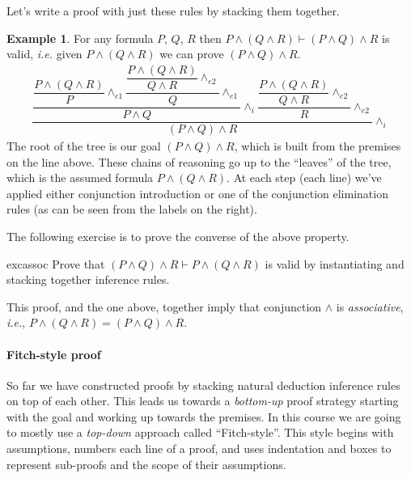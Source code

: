 \documentclass{article}
\theoremstyle{definition}
\newtheorem{example}{Example}
\newcommand{\ie}{\emph{i.e.}}
\begin{document}
Let's write a proof with just these rules by stacking them together.

\begin{example}
\label{exm:assoc-conj}
  For any formula $P$, $Q$, $R$ then $P \wedge (Q \wedge
  R) \vdash (P \wedge Q) \wedge R$ is valid, \ie{} given $P \wedge (Q \wedge
  R)$ we can prove $(P \wedge Q) \wedge R$.
%
\newcommand{\conge}[1]{\wedge_{e#1}}
  \begin{align*}
    \dfrac{
    \dfrac{\dfrac{P \wedge (Q \wedge R)}
    {P}\conge{1}
    \dfrac{\dfrac{P \wedge (Q \wedge R)}
    {Q \wedge R} \conge{2}}{Q} \conge{1}}
    {P \wedge Q} {\wedge_i}
    \dfrac{\dfrac{P \wedge (Q \wedge R)}
    {Q \wedge R} \conge{2}}{R} \conge{2}}
    {(P \wedge Q) \wedge R} {\wedge_i}
  \end{align*}
The root of the tree is our goal $(P \wedge Q) \wedge R$, which is
built from the premises on the line above. These chains of reasoning
go up to the ``leaves'' of the tree, which is the assumed formula
$P \wedge (Q \wedge R)$. At each step (each line) we've applied
either conjunction introduction or one of the conjunction elimination
rules (as can be seen from the labels on the right).
\end{example}
\noindent
The following exercise is to prove the converse of the above property.
%
\begin{restatable}{exc}{assoc}
  \label{exm:assoc}
  Prove that $(P \wedge Q) \wedge R \vdash P \wedge (Q \wedge R)$ is
  valid by instantiating and stacking together inference rules.
\end{restatable}
%
This proof, and the one above, together imply that conjunction
$\wedge$ is \emph{associative}, \ie{},
$P \wedge (Q \wedge R) = (P \wedge Q) \wedge R$.

\paragraph{Fitch-style proof}
So far we have constructed proofs by stacking natural
deduction inference rules on top of each other. This leads us towards a
\emph{bottom-up} proof strategy starting with the goal and working up
towards the premises. In this course we are going to mostly use a
\emph{top-down} approach called ``Fitch-style''. This style begins
with assumptions, numbers each line of a proof, and uses indentation
and boxes to represent sub-proofs and the scope of their assumptions.
\end{document}
